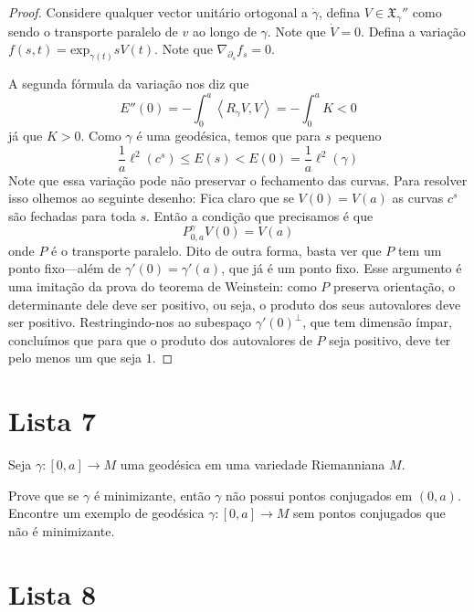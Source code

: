 \begin{proof}
Considere qualquer vector unitário ortogonal a $\dot \gamma$, defina $V\in
\mathfrak{X}_{\gamma}''$ como sendo o transporte paralelo de $v$ ao longo de
$\gamma$. Note que $\dot V=0$. Defina a variação
$f(s,t)=\text{exp}_{\gamma(t)}sV(t)$. Note que
$\nabla_{\partial_s}f_s=0$.

A segunda fórmula da variação nos diz que \[E''(0)=-\int_0^a \left<R_{\dot
\gamma}V,V\right>=-\int_0^a K<0\] já que $K>0$. Como $\gamma$ é uma geodésica,
temos que para $s$ pequeno \[\frac{1}{a}\ell^2(c^s)\leq E(s) < E(0)=
\frac{1}{a}\ell^2(\gamma)\] Note que essa variação pode não preservar o
fechamento das curvas. Para resolver isso olhemos ao seguinte desenho:
Fica claro que se $V(0)=V(a)$ as curvas $c^s$ são fechadas para toda $s$. Então
a condição que precisamos é que \[P^\gamma_{0,a}V(0)=V(a)\] onde $P$ é o
transporte paralelo. Dito de outra forma, basta ver que $P$ tem um ponto
fixo---além de $\gamma'(0)=\gamma'(a)$, que já é um ponto fixo. Esse argumento é
uma imitação da prova do teorema de Weinstein: como $P$ preserva orientação, o
determinante dele deve ser positivo, ou seja, o produto dos seus autovalores
deve ser positivo. Restringindo-nos ao subespaço $\gamma'(0)^\perp$, que tem
dimensão ímpar, concluímos que para que o produto dos autovalores de $P$ seja
positivo, deve ter pelo menos um que seja $1$.
\end{proof}

\section{Lista 7}
\label{section-lista-7}

\begin{exercise}
\label{exercise-minimizing-implies-no-conjugate-points}
Seja $\gamma:[0,a]\to M$ uma geodésica em uma variedade Riemanniana $M$.

 Prove que se $\gamma$ é minimizante, então $\gamma$ não possui pontos
 conjugados em  $(0,a)$. Encontre um exemplo de geodésica $\gamma:[0,a] \to M$ 
sem pontos conjugados que não é minimizante.
\end{exercise}

\section{Lista 8}
\label{section-lista-8}

